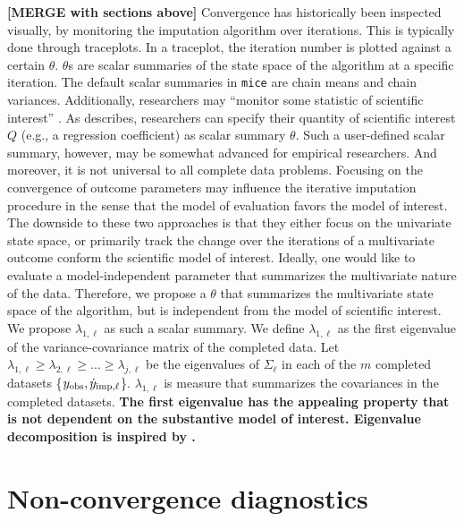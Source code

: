 \documentclass[Royal,times,sageh]{sagej}
\begin{document}
\textbf{{[}MERGE with sections above{]}} Convergence has historically been inspected visually, by monitoring the imputation algorithm over iterations. This is typically done through traceplots. In a traceplot, the iteration number is plotted against a certain \(\theta\). \(\theta\)s are scalar summaries of the state space of the algorithm at a specific iteration. The default scalar summaries in \texttt{mice} are chain means and chain variances. Additionally, researchers may ``monitor some statistic of scientific interest'' \citep[\(\S\) 6.5.2]{buur18}. As \citet{buur18} describes, researchers can specify their quantity of scientific interest \(Q\) (e.g., a regression coefficient) as scalar summary \(\theta\). Such a user-defined scalar summary, however, may be somewhat advanced for empirical researchers. And moreover, it is not universal to all complete data problems. Focusing on the convergence of outcome parameters may influence the iterative imputation procedure in the sense that the model of evaluation favors the model of interest. The downside to these two approaches is that they either focus on the univariate state space, or primarily track the change over the iterations of a multivariate outcome conform the scientific model of interest. Ideally, one would like to evaluate a model-independent parameter that summarizes the multivariate nature of the data. Therefore, we propose a \(\theta\) that summarizes the multivariate state space of the algorithm, but is independent from the model of scientific interest. We propose \(\lambda_{1, \ell}\) as such a scalar summary. We define \(\lambda_{1, \ell}\) as the first eigenvalue of the variance-covariance matrix of the completed data. Let \(\lambda_{1, \ell} \geq \lambda_{2, \ell} \geq ... \geq \lambda_{j, \ell}\) be the eigenvalues of \(\Sigma_\ell\) in each of the \(m\) completed datasets \{\(y_{\rm obs}, \dot y_{\rm imp, \ell}\)\}. \(\lambda_{1, \ell}\) is measure that summarizes the covariances in the completed datasets. \textbf{The first eigenvalue has the appealing property that is not dependent on the substantive model of interest. Eigenvalue decomposition is inspired by \citet{mack03}.}

\hypertarget{non-convergence-diagnostics}{%
\section{Non-convergence diagnostics}\label{non-convergence-diagnostics}}
\end{document}
